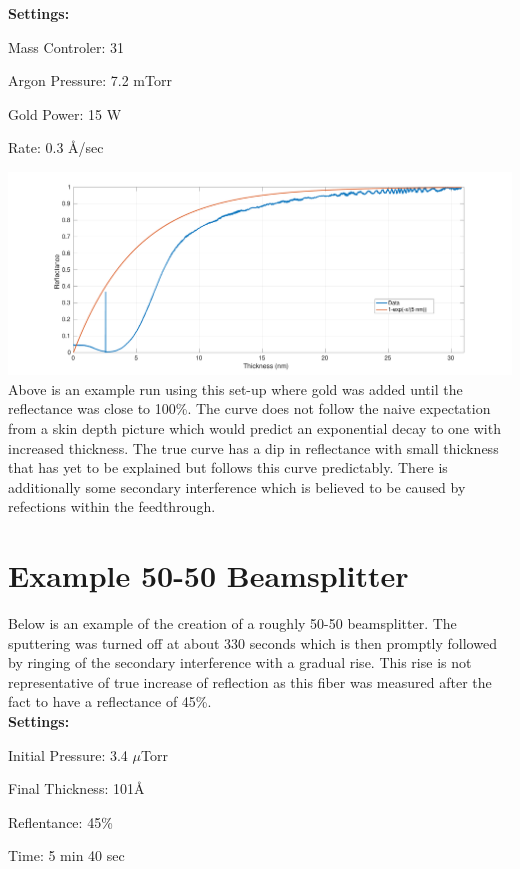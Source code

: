 \documentclass{article}
\begin{document}
\textbf{Settings:}

Mass Controler: 31

Argon Pressure: 7.2 mTorr

Gold Power: 15 W

Rate: 0.3 \AA/sec

\includegraphics[width=\textwidth]{Gold_Coating_Fiber.pdf}
Above is an example run using this set-up where gold was added until the reflectance was close to 100\%. The curve does not follow the naive expectation from a skin depth picture which would predict an exponential decay to one with increased thickness. The true curve has a dip in reflectance with small thickness that has yet to be explained but follows this curve predictably. There is additionally some secondary interference which is believed to be caused by refections within the feedthrough.

\section{Example 50-50 Beamsplitter}
Below is an example of the creation of a roughly 50-50 beamsplitter. The sputtering was turned off at about 330 seconds which is then promptly followed by ringing of the secondary interference with a gradual rise. This rise is not representative of true increase of reflection as this fiber was measured after the fact to have a reflectance of 45\%.\\

\textbf{Settings:}

Initial Pressure: 3.4 $\mu$Torr

Final Thickness: 101\AA

Reflentance: 45\%

Time:  5 min 40 sec
\end{document}
